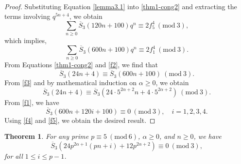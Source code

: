 \documentclass[12pt]{amsart}
\theoremstyle{plain}
\newtheorem{theorem}{Theorem}[section]
\theoremstyle{definition}
\begin{document}
\begin{proof} Substituting Equation \eqref{lemma3.1} into \eqref{thm1-cong2} and extracting the terms involving $q^{5n+4}$, we obtain
\begin{equation}
\sum_{n \geq 0} \overline{S}_{3}(120n+100) q^{n} \equiv 2f_{5}^{4} \ (\mathrm{mod} \ 3), \label{f1}
\end{equation}
which implies,
\begin{equation}
\sum_{n \geq 0} \overline{S}_{3}(600n+100) q^{n} \equiv 2f_{1}^{4} \ (\mathrm{mod} \ 3). \label{f2}
\end{equation}
From Equations \eqref{thm1-cong2} and \eqref{f2}, we find that
\begin{equation}
\overline{S}_{3}(24n+4) \equiv \overline{S}_{3}(600n+100) \ (\mathrm{mod} \ 3). \label{f3}
\end{equation}
From  \eqref{f3} and by mathematical induction on $\alpha \geq 0$, we obtain
\begin{equation}
\overline{S}_{3}(24n+4) \equiv \overline{S}_{3}(24 \cdot 5^{2\alpha+2}n+4\cdot 5^{2\alpha+2}) \ (\mathrm{mod} \ 3). \label{f4}
\end{equation}
From \eqref{f1}, we have
\begin{equation}
\overline{S}_{3}(600n+120i+100) \equiv 0 \ (\mathrm{mod} \ 3), \quad  i=1,2,3,4. \label{f5}
\end{equation}
Using \eqref{f4} and \eqref{f5}, we obtain the desired result.
\end{proof}








\begin{theorem} \label{thm2} For any prime $p\equiv 5 \ (\mathrm{mod} \ 6)$, $\alpha \geq 0$, and $n\geq 0$, we have
\begin{equation}
\overline{S}_{3} \left(24p^{2\alpha+1}(pn+i)+12p^{2\alpha+2}\right)\equiv 0 \ (\mathrm{mod} \ 3), \label{s3-famcongmod3}
\end{equation}
for all $1\leq i \leq p-1$.
\end{theorem}
\end{document}
